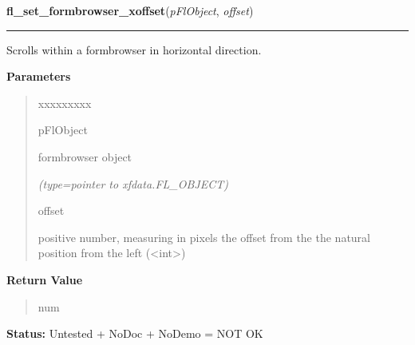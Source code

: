 \hspace{.8\funcindent}\begin{boxedminipage}{\funcwidth}

    \raggedright \textbf{fl\_set\_formbrowser\_xoffset}(\textit{pFlObject}, \textit{offset})

    \vspace{-1.5ex}

    \rule{\textwidth}{0.5\fboxrule}
\setlength{\parskip}{2ex}
    Scrolls within a formbrowser in horizontal direction.

\setlength{\parskip}{1ex}
      \textbf{Parameters}
      \vspace{-1ex}

      \begin{quote}
        \begin{Ventry}{xxxxxxxxx}

          \item[pFlObject]

          formbrowser object

            {\it (type=pointer to xfdata.FL\_OBJECT)}

          \item[offset]

          positive number, measuring in pixels the offset from the the 
          natural position from the left ({\textless}int{\textgreater})

        \end{Ventry}

      \end{quote}

      \textbf{Return Value}
    \vspace{-1ex}

      \begin{quote}
      num

      \end{quote}

\textbf{Status:} Untested + NoDoc + NoDemo = NOT OK



    \end{boxedminipage}

    \label{xformslib:flformbrowser:fl_set_formbrowser_yoffset}

    \vspace{0.5ex}

